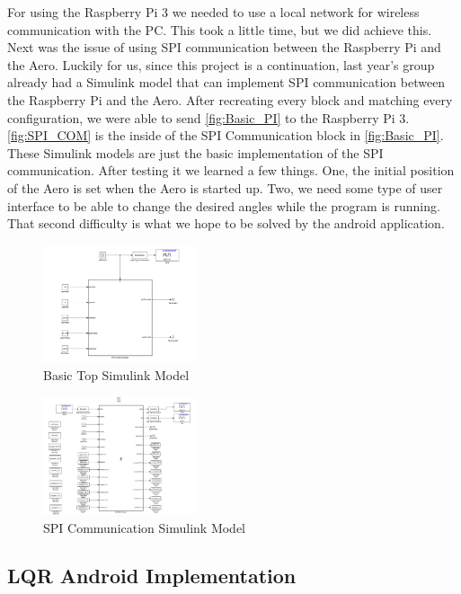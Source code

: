 \documentclass[letterpaper, 10pt, conference]{ieeeconf}
\begin{document}
For using the Raspberry Pi 3 we needed to use a local network for wireless communication with the PC.  This took a little time, but we did achieve this.  Next was the issue of using SPI communication between the Raspberry Pi and the Aero.  Luckily for us, since this project is a continuation, last year's group already had a Simulink model that can implement SPI communication between the Raspberry Pi and the Aero.  After recreating every block and matching every configuration, we were able to send \autoref{fig:Basic_PI} to the Raspberry Pi 3.  \autoref{fig:SPI_COM} is the inside of the SPI Communication block in \autoref{fig:Basic_PI}.  These Simulink models are just the basic implementation of the SPI communication.  After testing it we learned a few things.  One, the initial position of the Aero is set when the Aero is started up.  Two, we need some type of user interface to be able to change the desired angles while the program is running.  That second difficulty is what we hope to be solved by the android application.

\begin{figure}
  \centering
  \includegraphics[width=0.4\textwidth]{figs/img/Basic_PI}
  \caption{Basic Top Simulink Model}
  \label{fig:Basic_PI}
\end{figure}

\begin{figure}
  \centering
  \includegraphics[width=0.4\textwidth]{figs/img/SPI_COM}
  \caption{SPI Communication Simulink Model}
  \label{fig:SPI_COM}
\end{figure}

\subsection{LQR Android Implementation} \label{sec:LQR_And_imp}
\end{document}
